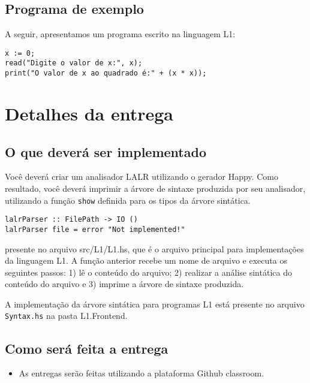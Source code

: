 \documentclass[a4paper,11pt]{article}
\begin{document}
\subsection*{Programa de exemplo}
\label{sec:org8a49391}

A seguir, apresentamos um programa escrito na linguagem L1:

\begin{verbatim}
x := 0;
read("Digite o valor de x:", x);
print("O valor de x ao quadrado é:" + (x * x));
\end{verbatim}
\section*{Detalhes da entrega}
\label{sec:org58a55d3}

\subsection*{O que deverá ser implementado}
\label{sec:orgeb43cc9}

Você deverá criar um analisador LALR utilizando 
o gerador Happy. Como resultado, você deverá imprimir a 
árvore de sintaxe produzida por seu analisador, utilizando a função 
\texttt{show} definida para os tipos da árvore sintática.

\begin{verbatim}
lalrParser :: FilePath -> IO ()
lalrParser file = error "Not implemented!"
\end{verbatim}

presente no arquivo src/L1/L1.hs, que é o arquivo principal para implementações da linguagem L1. 
A função anterior recebe um nome de arquivo e executa os seguintes passos: 1) lê o conteúdo do arquivo; 2) realizar a análise sintática do conteúdo do arquivo e 3) imprime a árvore de sintaxe produzida.

A implementação da árvore sintática para programas L1 está presente no arquivo \texttt{Syntax.hs}
na pasta L1.Frontend.
\subsection*{Como será feita a entrega}
\label{sec:org7f7a2e7}

\begin{itemize}
\item As entregas serão feitas utilizando a plataforma Github classroom.
\end{itemize}
\end{document}
